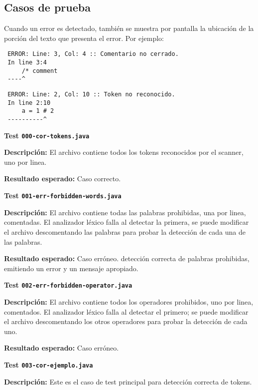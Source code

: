 \documentclass [a4paper,titlepage]{report}
\begin{document}
\subsection{Casos de prueba}

Cuando un error es detectado, también se muestra por pantalla la
ubicación de la porción del texto que presenta el error. Por ejemplo:

\begin{verbatim}
 ERROR: Line: 3, Col: 4 :: Comentario no cerrado.
 In line 3:4
     /* comment
 ----^
\end{verbatim}

\begin{verbatim}
 ERROR: Line: 2, Col: 10 :: Token no reconocido.
 In line 2:10
     a = 1 # 2
 ----------^
\end{verbatim}




\noindent
\textbf{Test \texttt{000-cor-tokens.java}}

\textbf{Descripción:} El archivo contiene todos los tokens reconocidos
por el scanner, uno por linea.

\textbf{Resultado esperado:} Caso correcto.




\noindent
\textbf{Test \texttt{001-err-forbidden-words.java}}

\textbf{Descripción:} El archivo contiene todas las palabras
prohibidas, una por linea, comentadas. El analizador léxico falla al
detectar la primera, se puede modificar el archivo descomentando las
palabras para probar la detección de cada una de las palabras.

\textbf{Resultado esperado:} Caso erróneo. detección correcta de palabras
prohibidas, emitiendo un error y un mensaje apropiado.




\noindent
\textbf{Test \texttt{002-err-forbidden-operator.java}}

\textbf{Descripción:} El archivo contiene todos los operadores
prohibidos, uno por linea, comentados. El analizador léxico falla al
detectar el primero; se puede modificar el archivo descomentando los
otros operadores para probar la detección de cada uno.

\textbf{Resultado esperado:} Caso erróneo. 




\noindent
\textbf{Test \texttt{003-cor-ejemplo.java}}

\textbf{Descripción:} Este es el caso de test principal para detección
correcta de tokens.
\end{document}

